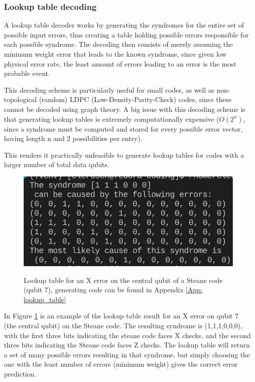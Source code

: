 \subsubsection{Lookup table decoding}
A lookup table decoder works by generating the 
syndromes for the entire set of possible input errors, thus creating a 
table holding possible errors responsible for each possible syndrome.
The decoding then consists of merely assuming the minimum weight
error that leads to the known syndrome, since given low physical 
error rate, the least amount of errors leading to an error is the most
probable event.

This decoding scheme is particularly useful for small codes, as well 
as non-topological (random) LDPC (Low-Density-Parity-Check) codes, since
these cannot be decoded using graph theory.
A big issue with this decoding scheme is that generating lookup tables is
extremely computationally expensive ($O(2^n)$, since a syndrome must be computed
and stored for every possible error vector, having length n and 2 possibilities per
entry). 

This renders it practically
unfeasible to generate lookup tables for codes with a larger number
of total data qubits.

\begin{figure}[h!]
	\begin{center}
	\captionsetup{justification=centering,margin=2cm}
	\includegraphics[scale=0.5]{./img/figures/X7errorlookup.png}\\
	\caption{Lookup table for an X error on the central qubit of
    a Steane code (qubit 7), generating code can be found in Appendix
    \ref{App: lookup_table}}
        
	\label{fig: lookup_table}
	\end{center}
\end{figure}

In Figure \ref{fig: lookup_table} is an example of the lookup table result for
an X error on qubit 7 (the central qubit) on the Steane code. 
The resulting syndrome is (1,1,1,0,0,0), with the first three
bits indicating the steane code faces X checks, and the second three bits
indicating the Steane code faces Z checks. 
The lookup table will return a set of many possible errors resulting in 
that syndrome, but simply choosing the one with the least number of errors 
(minimum weight) gives the correct error prediction.